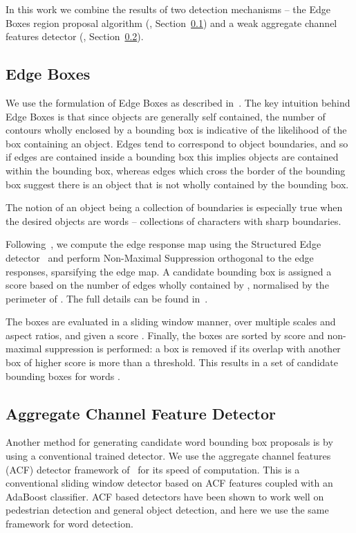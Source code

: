 \documentclass[twocolumn]{svjour3}          \smartqed  \usepackage{epsfig}
\begin{document}
In this work we combine the results of two detection mechanisms -- the Edge Boxes region proposal algorithm (\cite{Zitnick14}, Section~\ref{sec:edgeboxes}) and a weak aggregate channel features detector (\cite{Dollar14}, Section~\ref{sec:detector}). 

\subsection{Edge Boxes}
\label{sec:edgeboxes}
We use the formulation of Edge Boxes as described in~\cite{Zitnick14}. The key intuition behind Edge Boxes is that since objects are generally self contained, the number of contours wholly enclosed by a bounding box is indicative of the likelihood of the box containing an object. Edges tend to correspond to object boundaries, and so if edges are contained inside a bounding box this implies objects are contained within the bounding box, whereas edges which cross the border of the bounding box suggest there is an object that is not wholly contained by the bounding box.

The notion of an object being a collection of boundaries is especially true when the desired objects are words -- collections of characters with sharp boundaries.

Following~\cite{Zitnick14}, we compute the edge response map using the Structured Edge detector~\cite{Dollar13,Dollar14b} and perform Non-Maximal Suppression orthogonal to the edge responses, sparsifying the edge map. A candidate bounding box  is assigned a score  based on the number of edges wholly contained by , normalised by the perimeter of . The full details can be found in~\cite{Zitnick14}.

The boxes  are evaluated in a sliding window manner, over multiple scales and aspect ratios, and given a score . Finally, the boxes are sorted by score and non-maximal suppression is performed: a box is removed if its overlap with another box of higher score is more than a threshold. This results in a set of candidate bounding boxes for words .

\subsection{Aggregate Channel Feature Detector}
\label{sec:detector}
Another method for generating candidate word bounding box proposals is by using a conventional trained detector. We use the aggregate channel features (ACF) detector framework of~\cite{Dollar14} for its speed of computation. This is a conventional sliding window detector based on ACF features coupled with an AdaBoost classifier. ACF based detectors have been shown to work well on pedestrian detection and general object detection, and here we use the same framework for word detection.
\end{document}
